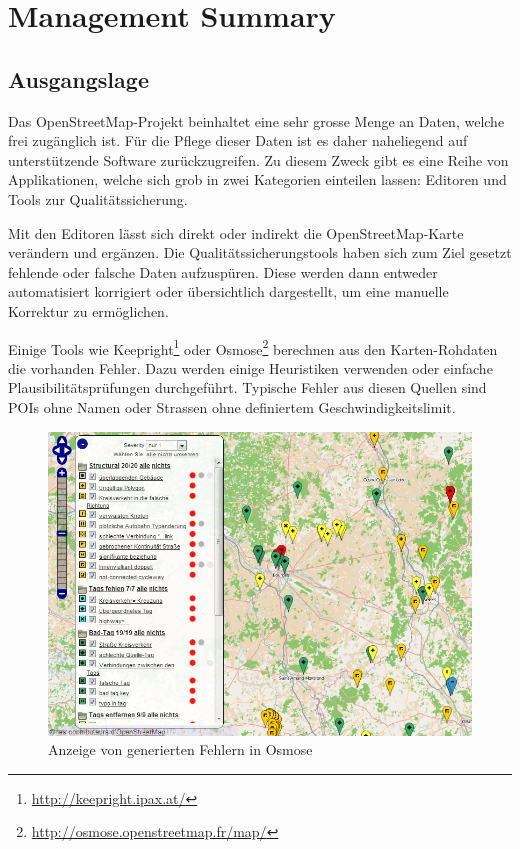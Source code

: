 \chapter*{Management Summary}
\thispagestyle{scrheadings}

\section*{Ausgangslage}
Das \gls{OpenStreetMap}-Projekt beinhaltet eine sehr grosse Menge an Daten, welche frei zugänglich ist.
Für die Pflege dieser Daten ist es daher naheliegend auf unterstützende Software zurückzugreifen.
Zu diesem Zweck gibt es eine Reihe von Applikationen, welche sich grob in zwei Kategorien einteilen lassen:
Editoren und Tools zur Qualitätssicherung.

Mit den Editoren lässt sich direkt oder indirekt die \gls{OpenStreetMap}-Karte verändern und ergänzen.
Die Qualitätssicherungstools haben sich zum Ziel gesetzt fehlende oder falsche Daten aufzuspüren.
Diese werden dann entweder automatisiert korrigiert oder übersichtlich dargestellt, um eine manuelle Korrektur zu ermöglichen.

Einige Tools wie Keepright\footnote{\url{http://keepright.ipax.at/}} oder Osmose\footnote{\url{http://osmose.openstreetmap.fr/map/}} berechnen aus den Karten-Rohdaten die vorhanden Fehler.
Dazu werden einige Heuristiken verwenden oder einfache Plausibilitätsprüfungen durchgeführt.
Typische Fehler aus diesen Quellen sind \gls{POI}s ohne Namen oder Strassen ohne definiertem Geschwindigkeitslimit.

\begin{figure}[H]
	\centering
	\includegraphics[scale=0.4]{images/managementsummary/osmose-screenshot}
	\caption{Anzeige von generierten Fehlern in Osmose}
	\label{image-osmose-screenshot}
\end{figure}

